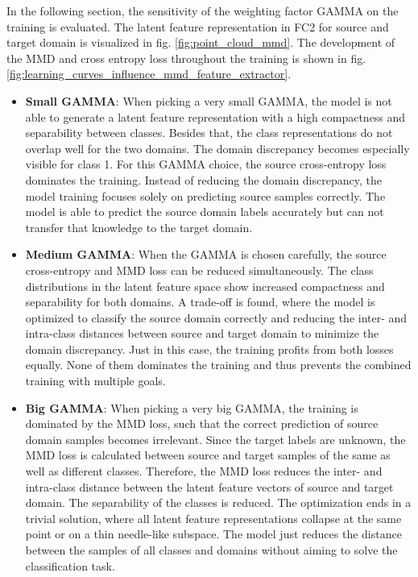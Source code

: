 In the following section, the sensitivity of the weighting factor GAMMA on the training is evaluated. The latent feature representation in FC2 for source and target domain is visualized in fig. \ref{fig:point_cloud_mmd}. The development of the MMD and cross entropy loss throughout the training is shown in fig. \ref{fig:learning_curves_influence_mmd_feature_extractor}.
\begin{itemize}
    \item \textbf{Small GAMMA}:
    When picking a very small GAMMA, the model is not able to generate a latent feature representation with a high compactness and separability between classes. Besides that, the class representations do not overlap well for the two domains. The domain discrepancy becomes especially visible for class 1. For this GAMMA choice, the source cross-entropy loss dominates the training. Instead of reducing the domain discrepancy, the model training focuses solely on predicting source samples correctly. The model is able to predict the source domain labels accurately but can not transfer that knowledge to the target domain. 
    \item \textbf{Medium GAMMA}:
    When the GAMMA is chosen carefully, the source cross-entropy and MMD loss can be reduced simultaneously. The class distributions in the latent feature space show increased compactness and separability for both domains. A trade-off is found, where the model is optimized to classify the source domain correctly and reducing the inter- and intra-class distances between source and target domain to minimize the domain discrepancy. Just in this case, the training profits from both losses equally. None of them dominates the training and thus prevents the combined training with multiple goals.
    \item \textbf{Big GAMMA}:
    When picking a very big GAMMA, the training is dominated by the MMD loss, such that the correct prediction of source domain samples becomes irrelevant. Since the target labels are unknown, the MMD loss is calculated between source and target samples of the same as well as different classes. Therefore, the MMD loss reduces the inter- and intra-class distance between the latent feature vectors of source and target domain. The separability of the classes is reduced. The optimization ends in a trivial solution, where all latent feature representations collapse at the same point or on a thin needle-like subspace. The model just reduces the distance between the samples of all classes and domains without aiming to solve the classification task.
\end{itemize}


